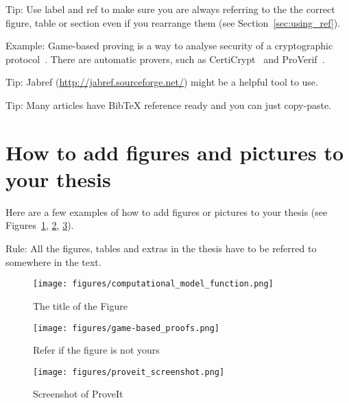 \documentclass[12pt]{article}
\newcommand{\proveit} {ProveIt\xspace}
\begin{document}
Tip: Use label and ref to make sure you are always referring to the the correct figure, table or section even if you rearrange them (see Section~\ref{sec:using_ref}).



Example: Game-based proving is a way to analyse security of a cryptographic protocol~\citep{GameB_1, GameB_2}. There are automatic provers, such as {CertiCrypt\-}~\citep{certicrypt} and ProVerif~\citep{proVerif}.

Tip: Jabref (\url{http://jabref.sourceforge.net/}) might be a helpful tool to use.

Tip: Many articles have BibTeX reference ready and you can just copy-paste.



\newpage
\section{How to add figures and pictures to your thesis}


Here are a few examples of how to add figures or pictures to your thesis (see Figures~\ref{fig:fnCompModel}, \ref{fig:figures/game-based_proofs.png}, \ref{fig:figures/proveit_screenshot.png}).

Rule: All the figures, tables and extras in the thesis have to be referred to somewhere in the text.



\begin{figure} [ht] %
\begin{center}
\texttt{[image: figures/computational\_model\_function.png]}
\caption{The title of the Figure}
\label{fig:fnCompModel}
\end{center}
\end{figure}



\begin{figure} [!ht] %
\begin{center}
\texttt{[image: figures/game-based\_proofs.png]}
\caption{Refer if the figure is not yours~\citep{kamm12}}
\label{fig:figures/game-based_proofs.png}
\end{center}
\end{figure}


\begin{figure} [ht]
\begin{center}
\texttt{[image: figures/proveit\_screenshot.png]}
\caption{Screenshot of \proveit}
\label{fig:figures/proveit_screenshot.png}
\end{center}
\end{figure}
\end{document}
